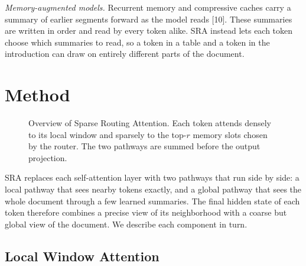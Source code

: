 \documentclass[conference,letterpaper]{IEEEtran}
\begin{document}
\textit{Memory-augmented models.} Recurrent memory and compressive caches carry a summary of earlier segments forward as the model reads [10]. These summaries are written in order and read by every token alike. SRA instead lets each token choose which summaries to read, so a token in a table and a token in the introduction can draw on entirely different parts of the document.

\section{Method}

\begin{figure}[t]
\centering
{}
\caption{Overview of Sparse Routing Attention. Each token attends densely to its local window and sparsely to the top-$r$ memory slots chosen by the router. The two pathways are summed before the output projection.}
\label{fig:overview}
\end{figure}

SRA replaces each self-attention layer with two pathways that run side by side: a local pathway that sees nearby tokens exactly, and a global pathway that sees the whole document through a few learned summaries. The final hidden state of each token therefore combines a precise view of its neighborhood with a coarse but global view of the document. We describe each component in turn.

\subsection{Local Window Attention}
\end{document}
